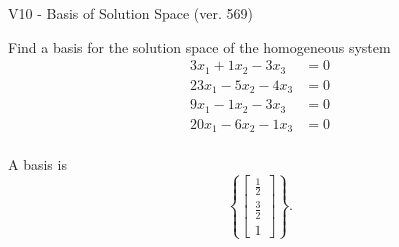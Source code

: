 \begin{exercise}
  \begin{exerciseTitle}V10 - Basis of Solution Space (ver. 569)\end{exerciseTitle}
  \begin{exerciseStatement}
    Find a basis for the solution space of the homogeneous system 
\begin{align*}
 3 x_ 1 + 1 x_ 2 -3 x_ 3 &= 0  \\ 
  23 x_ 1 -5 x_ 2 -4 x_ 3 &= 0  \\ 
  9 x_ 1 -1 x_ 2 -3 x_ 3 &= 0  \\ 
  20 x_ 1 -6 x_ 2 -1 x_ 3 &= 0  \\ 
 \end{align*}


 
  \end{exerciseStatement}

  \begin{exerciseAnswer}
   A basis is   
\[\left\{\left[\begin{array}{c}
\frac{1}{2} \\
\frac{3}{2} \\
1
\end{array}\right]\right\}.\]

  


  \end{exerciseAnswer}
\end{exercise}
